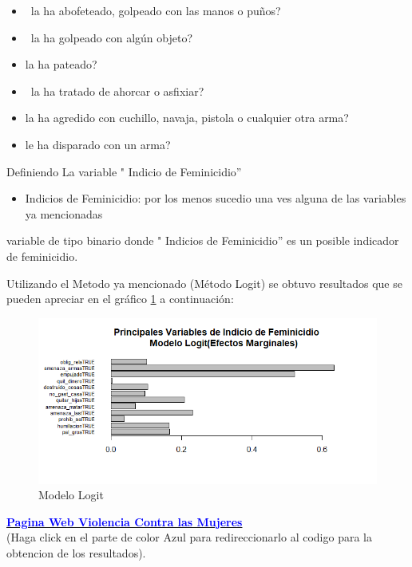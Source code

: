 \documentclass[11pt,letter]{article}
\begin{document}
\begin{itemize}
    \item  la ha abofeteado, golpeado con las manos o puños?

\item  la ha golpeado con algún objeto?

\item	 la ha pateado?
\item	 la ha tratado de ahorcar o asfixiar?

\item	la ha agredido con cuchillo, navaja, pistola o cualquier otra arma?

\item	le ha disparado con un arma?
 
\end{itemize}

Definiendo La variable " Indicio de Feminicidio'' 
\begin{itemize}
    \item Indicios de Feminicidio: por los menos sucedio una ves alguna de las variables ya mencionadas

\end{itemize}
variable de tipo binario
donde " Indicios de Feminicidio'' es un posible indicador de feminicidio.

Utilizando el Metodo ya mencionado (Método Logit) se obtuvo resultados que se pueden apreciar en el gráfico \ref{f1_log} a continuación: 

\begin{figure}[!htp]
\includegraphics[scale=0.7]{log2.png}
\caption{Modelo Logit}
\label{f1_log}
\end{figure}

\href{https://ealaurel.github.io/mi_proyecto1_EST_384/proy_MineriaDatos/clasificacion_logit_probit.html}{\textbf{\textcolor{blue}{Pagina Web Violencia Contra las Mujeres}}}
\\(Haga click en el parte de color Azul para redireccionarlo al codigo para la obtencion de los resultados).
\end{document}
